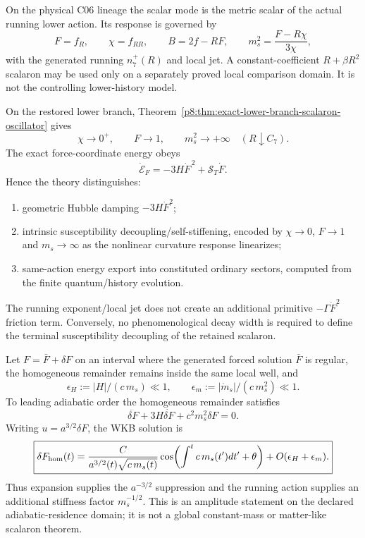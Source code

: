 \documentclass[12pt,a4paper]{article}
\begin{document}
\begin{theorem}
\label{p8:thm:v2178-scalaron-native-precedence}
On the physical C06 lineage the scalar mode is the metric scalar of the actual
running lower action.  Its response is governed by
\[
 F=f_R,\qquad \chi=f_{RR},\qquad B=2f-RF,\qquad
 m_s^2=\frac{F-R\chi}{3\chi},
\]
with the generated running $n_7^+(R)$ and local jet.  A constant-coefficient
$R+\beta R^2$ scalaron may be used only on a separately proved local comparison
domain.  It is not the controlling lower-history model.
\end{theorem}

\begin{theorem}
\label{p8:thm:v2178-intrinsic-scalaron-decoupling}
On the restored lower branch, Theorem~\ref{p8:thm:exact-lower-branch-scalaron-oscillator}
gives
\[
 \chi\to0^+,\qquad F\to1,\qquad m_s^2\to+\infty
 \quad(R\downarrow C_7).
\]
The exact force-coordinate energy obeys
\[
 \boxed{\dot{\mathcal E}_F=-3H\dot F^{\,2}+\mathcal S_T\dot F.}
\]
Hence the theory distinguishes:
\begin{enumerate}
\item geometric Hubble damping $-3H\dot F^2$;
\item intrinsic susceptibility decoupling/self-stiffening, encoded by
$\chi\to0$, $F\to1$ and $m_s\to\infty$ as the nonlinear curvature response
linearizes;
\item same-action energy export into constituted ordinary sectors, computed
from the finite quantum/history evolution.
\end{enumerate}
The running exponent/local jet does not create an additional primitive
$-\Gamma\dot F^2$ friction term.  Conversely, no phenomenological decay width
is required to define the terminal susceptibility decoupling of the retained
scalaron.
\end{theorem}

\begin{corollary}
\label{p8:cor:v2178-scalaron-coherent-envelope}
Let $F=\bar F+\delta F$ on an interval where the generated forced solution
$\bar F$ is regular, the homogeneous remainder remains inside the same local
well, and
\[
 \epsilon_H:=|H|/(c\,m_s)\ll1,\qquad
 \epsilon_m:=|\dot m_s|/(c\,m_s^2)\ll1.
\]
To leading adiabatic order the homogeneous remainder satisfies
\[
 \ddot{\delta F}+3H\dot{\delta F}+c^2m_s^2\delta F=0.
\]
Writing $u=a^{3/2}\delta F$, the WKB solution is
\[
 \boxed{\delta F_{\rm hom}(t)=
 \frac{C}{a^{3/2}(t)\sqrt{c\,m_s(t)}}
 \cos\!\left(\int^t c\,m_s(t')dt'+\theta\right)
 +O(\epsilon_H+\epsilon_m).}
\]
Thus expansion supplies the $a^{-3/2}$ suppression and the running action
supplies an additional stiffness factor $m_s^{-1/2}$.  This is an amplitude
statement on the declared adiabatic-residence domain; it is not a global
constant-mass or matter-like scalaron theorem.
\end{corollary}
\end{document}
